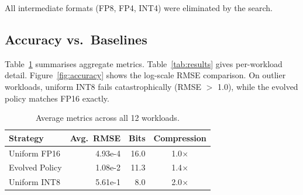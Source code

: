 \documentclass[10pt,twocolumn]{article}
\begin{document}
All intermediate formats (FP8, FP4, INT4) were eliminated by the search.

\subsection{Accuracy vs.\ Baselines}

Table~\ref{tab:avg_results} summarises aggregate metrics.
Table~\ref{tab:results} gives per-workload detail.
Figure~\ref{fig:accuracy} shows the log-scale RMSE comparison.
On outlier workloads, uniform INT8 fails catastrophically (RMSE $>$ 1.0),
while the evolved policy matches FP16 exactly.

\begin{table}[tbp]
\centering
\caption{Average metrics across all 12 workloads.}
\label{tab:avg_results}
\small
\begin{tabular}{lrrc}
\toprule
Strategy & Avg.\ RMSE & Bits & Compression \\
\midrule
Uniform FP16   & 4.93e-4 & 16.0 & 1.0$\times$ \\
Evolved Policy & 1.08e-2 & 11.3 & 1.4$\times$ \\
Uniform INT8   & 5.61e-1 &  8.0 & 2.0$\times$ \\
\bottomrule
\end{tabular}
\end{table}
\end{document}
